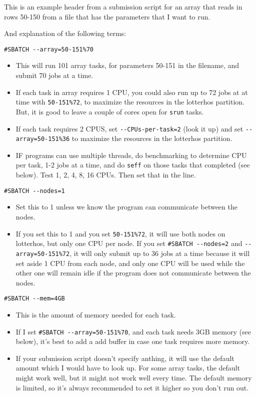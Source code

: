 \documentclass[
  letterpaper,
  DIV=11,
  numbers=noendperiod]{scrreprt}
\begin{document}
This is an example header from a submission script for an array that
reads in rows 50-150 from a file that has the parameters that I want to
run.

And explanation of the following terms:

\texttt{\#SBATCH\ -\/-array=50-151\%70}

\begin{itemize}
\item
  This will run 101 array tasks, for parameters 50-151 in the filename,
  and submit 70 jobs at a time.
\item
  If each task in array requires 1 CPU, you could also run up to 72 jobs
  at at time with \texttt{50-151\%72}, to maximize the resources in the
  lotterhos partition. But, it is good to leave a couple of cores open
  for \texttt{srun} tasks.
\item
  If each task requires 2 CPUS, set \texttt{-\/-CPUs-per-task=2} (look
  it up) and set \texttt{-\/-array=50-151\%36} to maximize the resources
  in the lotterhos partition.
\item
  IF programs can use multiple threads, do benchmarking to determine CPU
  per task, 1-2 jobs at a time, and do \texttt{seff} on those tasks that
  completed (see below). Test 1, 2, 4, 8, 16 CPUs. Then set that in the
  line.
\end{itemize}

\texttt{\#SBATCH\ -\/-nodes=1}

\begin{itemize}
\item
  Set this to 1 unless we know the program can communicate between the
  nodes.
\item
  If you set this to 1 and you set \texttt{50-151\%72}, it will use both
  nodes on lotterhos, but only one CPU per node. If you set
  \texttt{\#SBATCH\ -\/-nodes=2} and \texttt{-\/-array=50-151\%72}, it
  will only submit up to 36 jobs at a time because it will set aside 1
  CPU from each node, and only one CPU will be used while the other one
  will remain idle if the program does not communicate between the
  nodes.
\end{itemize}

\texttt{\#SBATCH\ -\/-mem=4GB}

\begin{itemize}
\item
  This is the amount of memory needed for each task.
\item
  If I set \texttt{\#SBATCH\ -\/-array=50-151\%70}, and each task needs
  3GB memory (see below), it's best to add a add buffer in case one task
  requires more memory.
\item
  If your submission script doesn't specify anthing, it will use the
  default amount which I would have to look up. For some array tasks,
  the default might work well, but it might not work well every time.
  The default memory is limited, so it's always recommended to set it
  higher so you don't run out.
\end{itemize}
\end{document}
